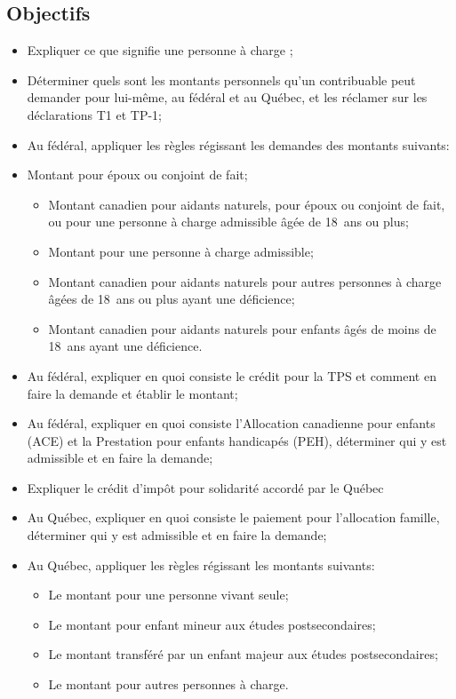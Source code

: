 \subsection{Objectifs}
\begin{itemize}[label=]
	\item Expliquer ce que signifie une \og personne à charge \fg{};
	\item Déterminer quels sont les montants personnels qu'un contribuable peut demander pour lui-même, au fédéral et au Québec, et les réclamer sur les déclarations T1 et TP-1;
	\item Au fédéral, appliquer les règles régissant les demandes des montants suivants:
	\item Montant pour époux ou conjoint de fait;
	\begin{itemize}
		\item Montant canadien pour aidants naturels, pour époux ou conjoint de fait, ou pour une personne à charge admissible âgée de 18~ans ou plus;
		\item Montant pour une personne à charge admissible;
		\item Montant canadien pour aidants naturels pour autres personnes à charge âgées de 18~ans ou plus ayant une déficience;
		\item Montant canadien pour aidants naturels pour enfants âgés de moins de 18~ans ayant une déficience.
	\end{itemize}
	\item Au fédéral, expliquer en quoi consiste le crédit pour la TPS et comment en faire la demande et établir le montant;
	\item Au fédéral, expliquer en quoi consiste l'Allocation canadienne pour enfants (ACE) et la Prestation pour enfants handicapés (PEH), déterminer qui y est admissible et en faire la demande;
	\item Expliquer le crédit d'impôt pour solidarité accordé par le Québec
	\item Au Québec, expliquer en quoi consiste le paiement pour l'allocation famille, déterminer qui y est admissible et en faire la demande;
	\item Au Québec, appliquer les règles régissant les montants suivants:
	\begin{itemize}
		\item Le montant pour une personne vivant seule;
		\item Le montant pour enfant mineur aux études postsecondaires;
		\item Le montant transféré par un enfant majeur aux études postsecondaires;
		\item Le montant pour autres personnes à charge.
	\end{itemize}
\end{itemize}


